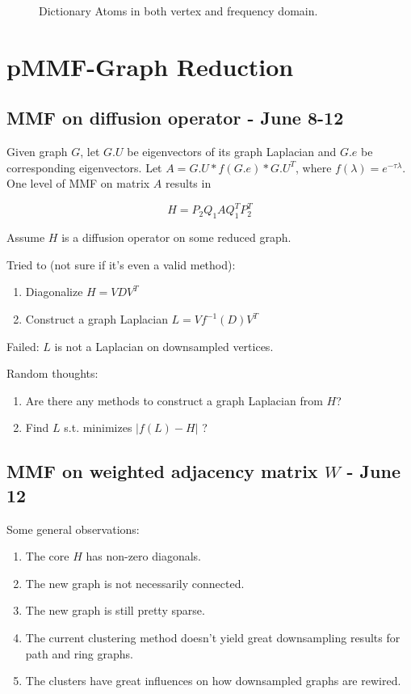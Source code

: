 \documentclass[a4paper]{article}
\begin{document}
\begin{figure}[H]
\caption{\label{fig:sensor net} Dictionary Atoms in both vertex and frequency domain.}
\end{figure}



\section{pMMF-Graph Reduction}

\subsection{MMF on diffusion operator - June 8-12}
Given graph $G$, let $G.U$ be eigenvectors of its graph Laplacian and $G.e$ be corresponding eigenvectors. Let $A = G.U*f(G.e)*G.U^T$, where $f(\lambda) = e^{-\tau\lambda}$. One level of MMF on matrix $A$ results in

$$H = P_2Q_1AQ_1^TP_2^T$$

Assume $H$ is a diffusion operator on some reduced graph. 

Tried to (not sure if it's even a valid method):

\begin{enumerate}
\item Diagonalize $H = VDV^T$
\item Construct a graph Laplacian $L = Vf^{-1}(D)V^T$
\end{enumerate}

Failed: $L$ is not a Laplacian on downsampled vertices.

\smallskip
Random thoughts:
\begin{enumerate}
\item Are there any methods to construct a graph Laplacian from $H$? 
\item Find $L$ s.t. minimizes $|f(L) - H|$ ?
\end{enumerate}


\subsection{MMF on weighted adjacency matrix $W$ - June 12}
Some general observations:
\begin{enumerate}
\item The core $H$ has non-zero diagonals.
\item The new graph is not necessarily connected.
\item The new graph is still pretty sparse.

\item The current clustering method doesn't yield great downsampling results for path and ring graphs. 

\item The clusters have great influences on how downsampled graphs are rewired.
\end{enumerate}
\end{document}
